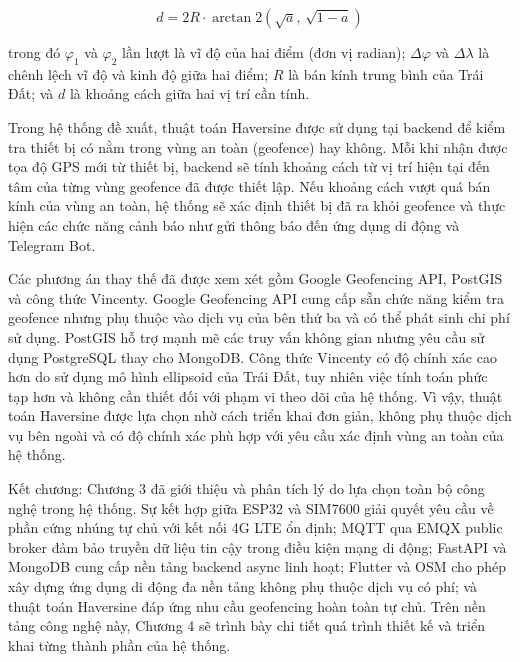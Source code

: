 \documentclass[../DoAn.tex]{subfiles}
\begin{document}
\begin{equation}
d = 2R \cdot \arctan2\!\left(\sqrt{a},\, \sqrt{1-a}\right)
\label{eq:haversine_d}
\end{equation}

\noindent trong đó $\varphi_1$ và $\varphi_2$ lần lượt là vĩ độ của hai điểm (đơn vị radian); $\Delta\varphi$ và $\Delta\lambda$ là chênh lệch vĩ độ và kinh độ giữa hai điểm; $R$ là bán kính trung bình của Trái Đất; và $d$ là khoảng cách giữa hai vị trí cần tính.

Trong hệ thống đề xuất, thuật toán Haversine được sử dụng tại backend để kiểm tra thiết bị có nằm trong vùng an toàn (geofence) hay không. Mỗi khi nhận được tọa độ GPS mới từ thiết bị, backend sẽ tính khoảng cách từ vị trí hiện tại đến tâm của từng vùng geofence đã được thiết lập. Nếu khoảng cách vượt quá bán kính của vùng an toàn, hệ thống sẽ xác định thiết bị đã ra khỏi geofence và thực hiện các chức năng cảnh báo như gửi thông báo đến ứng dụng di động và Telegram Bot.

Các phương án thay thế đã được xem xét gồm Google Geofencing API, PostGIS và công thức Vincenty. Google Geofencing API cung cấp sẵn chức năng kiểm tra geofence nhưng phụ thuộc vào dịch vụ của bên thứ ba và có thể phát sinh chi phí sử dụng. PostGIS hỗ trợ mạnh mẽ các truy vấn không gian nhưng yêu cầu sử dụng PostgreSQL thay cho MongoDB. Công thức Vincenty có độ chính xác cao hơn do sử dụng mô hình ellipsoid của Trái Đất, tuy nhiên việc tính toán phức tạp hơn và không cần thiết đối với phạm vi theo dõi của hệ thống. Vì vậy, thuật toán Haversine được lựa chọn nhờ cách triển khai đơn giản, không phụ thuộc dịch vụ bên ngoài và có độ chính xác phù hợp với yêu cầu xác định vùng an toàn của hệ thống.

Kết chương: Chương 3 đã giới thiệu và phân tích lý do lựa chọn toàn bộ công nghệ trong hệ thống. Sự kết hợp giữa ESP32 và SIM7600 giải quyết yêu cầu về phần cứng nhúng tự chủ với kết nối 4G LTE ổn định; MQTT qua EMQX public broker đảm bảo truyền dữ liệu tin cậy trong điều kiện mạng di động; FastAPI và MongoDB cung cấp nền tảng backend async linh hoạt; Flutter và OSM cho phép xây dựng ứng dụng di động đa nền tảng không phụ thuộc dịch vụ có phí; và thuật toán Haversine đáp ứng nhu cầu geofencing hoàn toàn tự chủ. Trên nền tảng công nghệ này, Chương 4 sẽ trình bày chi tiết quá trình thiết kế và triển khai từng thành phần của hệ thống.
\end{document}
